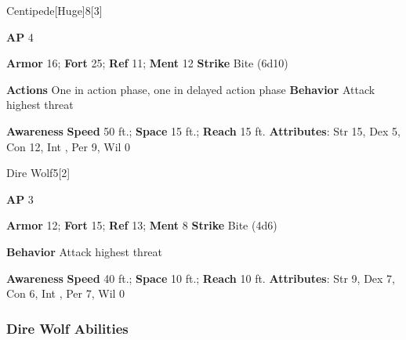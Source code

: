 \begin{monsection}{Centipede}[Huge]{8}[3]
\vspace{-1em}\vspace{-1em}
\begin{spellcontent}
\begin{spelltargetinginfo}
{\textbf{AP} 4}

\pari \textbf{Armor} 16;
\textbf{Fort} 25;
\textbf{Ref} 11;
\textbf{Ment} 12
\pari \textbf{Strike} Bite  (6d10)


\pari \textbf{Actions} One in action phase, one in delayed action phase
\pari \textbf{Behavior} Attack highest threat
\end{spelltargetinginfo}
\end{spellcontent}

\begin{monsterfooter}
\pari \textbf{Awareness} 
\pari \textbf{Speed} 50 ft.;
\textbf{Space} 15 ft.;
\textbf{Reach} 15 ft.
\pari \textbf{Attributes}:
Str 15,
Dex 5,
Con 12,
Int ,
Per 9,
Wil 0
\end{monsterfooter}
\end{monsection}

\begin{monsection}{Dire Wolf}{5}[2]
\vspace{-1em}\vspace{-1em}
\begin{spellcontent}
\begin{spelltargetinginfo}
{\textbf{AP} 3}

\pari \textbf{Armor} 12;
\textbf{Fort} 15;
\textbf{Ref} 13;
\textbf{Ment} 8
\pari \textbf{Strike} Bite  (4d6)



\pari \textbf{Behavior} Attack highest threat
\end{spelltargetinginfo}
\end{spellcontent}

\begin{monsterfooter}
\pari \textbf{Awareness} 
\pari \textbf{Speed} 40 ft.;
\textbf{Space} 10 ft.;
\textbf{Reach} 10 ft.
\pari \textbf{Attributes}:
Str 9,
Dex 7,
Con 6,
Int ,
Per 7,
Wil 0
\end{monsterfooter}
\end{monsection}


\subsubsection{Dire Wolf Abilities}

